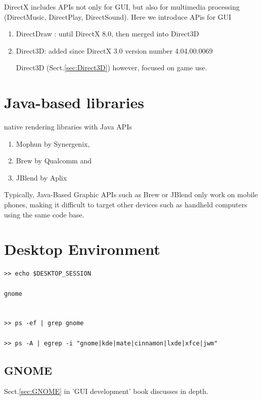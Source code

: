 DirectX includes APIs not only for GUI, but also for multimedia processing
(DirectMusic, DirectPlay, DirectSound).
Here we introduce APis for GUI
\begin{enumerate}
  \item DirectDraw : until DirectX 8.0, then merged into Direct3D
  \item Direct3D: added since DirectX 3.0 version number 4.04.00.0069
  
Direct3D (Sect.\ref{sec:Direct3D}) however, focused on game use.  
\end{enumerate}

\section{Java-based libraries}

native rendering libraries with Java APIs 
\begin{enumerate}
  \item Mophun
  by  Synergenix,  
  
  \item Brew
  by  Qualcomm  and
  
  \item JBlend by  Aplix
\end{enumerate}

Typically,  Java-Based  Graphic  APIs  such  as  
Brew  or  JBlend  only  work  on  mobile  phones,  making  it  difficult  
to target other devices such as handheld computers using the same 
code  base.



\section{Desktop Environment}
\label{sec:desktop_environment}

\begin{verbatim}
>> echo $DESKTOP_SESSION

gnome


>> ps -ef | grep gnome

>> ps -A | egrep -i "gnome|kde|mate|cinnamon|lxde|xfce|jwm"
\end{verbatim}

\subsection{GNOME}

Sect.\ref{sec:GNOME} in 'GUI development' book discusses in depth.

